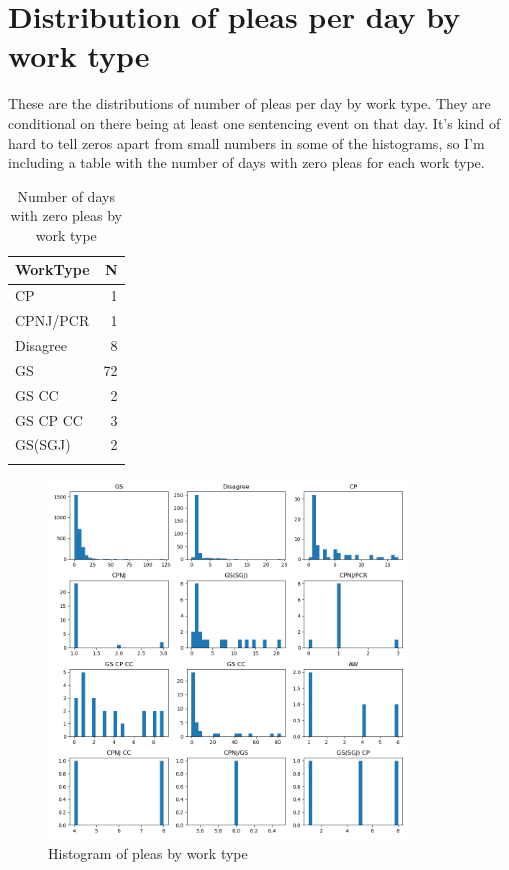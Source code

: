 \documentclass[11pt]{article}
\begin{document}
\section{Distribution of pleas per day by work type}
  These are the distributions of number of pleas per day by work type. They are conditional on there being at least one sentencing event on that day. It's kind of hard to tell zeros apart from small numbers in some of the histograms, so I'm including a table with the number of days with zero pleas for each work type.

  \begin{table}[H]
    \centering
    \caption{Number of days with zero pleas by work type}
    \begin{tabular}{lr}
    WorkType &  N \\
    \hline
          CP &  1 \\
    CPNJ/PCR &  1 \\
    Disagree &  8 \\
          GS & 72 \\
       GS CC &  2 \\
    GS CP CC &  3 \\
     GS(SGJ) &  2 \\
    \hline \\
    \end{tabular}
  \end{table}


  \begin{figure}[H]
    \centering
    \caption{Histogram of pleas by work type}
    \includegraphics[width=0.85\textwidth]{../../../output/figures/Exploration/plea_by_work_type_hist.png}
  \end{figure}
\end{document}
